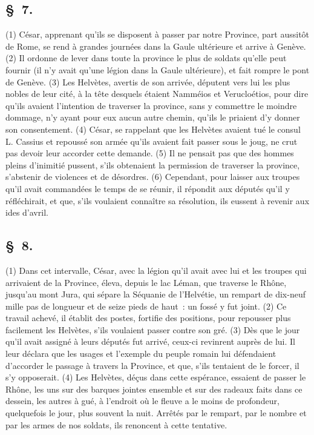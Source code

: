 \documentclass[french,twoside]{book} %
\begin{document}
\subsection[{§ 7.}]{ \textsc{§ 7.} }
\noindent (1) César, apprenant qu’ils se disposent à passer par notre Province, part aussitôt de Rome, se rend à grandes journées dans la Gaule ultérieure et arrive à Genève. (2) Il ordonne de lever dans toute la province le plus de soldats qu’elle peut fournir (il n’y avait qu’une légion dans la Gaule ultérieure), et fait rompre le pont de Genève. (3) Les Helvètes, avertis de son arrivée, députent vers lui les plus nobles de leur cité, à la tête desquels étaient Namméios et Verucloétios, pour dire qu’ils avaient l’intention de traverser la province, sans y commettre le moindre dommage, n’y ayant pour eux aucun autre chemin, qu’ils le priaient d’y donner son consentement. (4) César, se rappelant que les Helvètes avaient tué le consul L. Cassius et repoussé son armée qu’ils avaient fait passer sous le joug, ne crut pas devoir leur accorder cette demande. (5) Il ne pensait pas que des hommes pleins d’inimitié pussent, s’ils obtenaient la permission de traverser la province, s’abstenir de violences et de désordres. (6) Cependant, pour laisser aux troupes qu’il avait commandées le temps de se réunir, il répondit aux députés qu’il y réfléchirait, et que, s’ils voulaient connaître sa résolution, ils eussent à revenir aux ides d’avril.
\subsection[{§ 8.}]{ \textsc{§ 8.} }
\noindent (1) Dans cet intervalle, César, avec la légion qu’il avait avec lui et les troupes qui arrivaient de la Province, éleva, depuis le lac Léman, que traverse le Rhône, jusqu’au mont Jura, qui sépare la Séquanie de l’Helvétie, un rempart de dix-neuf mille pas de longueur et de seize pieds de haut : un fossé y fut joint. (2) Ce travail achevé, il établit des postes, fortifie des positions, pour repousser plus facilement les Helvètes, s’ils voulaient passer contre son gré. (3) Dès que le jour qu’il avait assigné à leurs députés fut arrivé, ceux-ci revinrent auprès de lui. Il leur déclara que les usages et l’exemple du peuple romain lui défendaient d’accorder le passage à travers la Province, et que, s’ils tentaient de le forcer, il s’y opposerait. (4) Les Helvètes, déçus dans cette espérance, essaient de passer le Rhône, les uns sur des barques jointes ensemble et sur des radeaux faits dans ce dessein, les autres à gué, à l’endroit où le fleuve a le moins de profondeur, quelquefois le jour, plus souvent la nuit. Arrêtés par le rempart, par le nombre et par les armes de nos soldats, ils renoncent à cette tentative.
\end{document}
